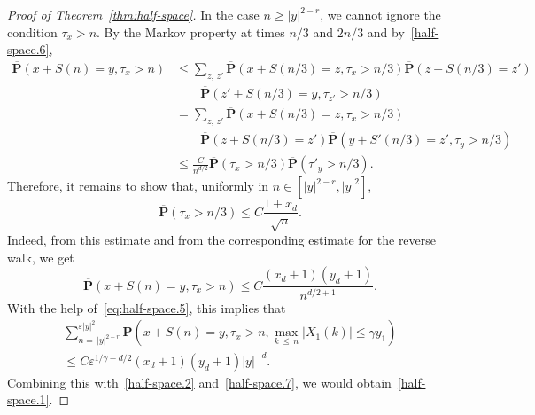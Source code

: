 \documentclass[10pt]{amsart}
\theoremstyle{definition}\newtheorem{defi}[theo]{Definition}\newtheorem{rema}[theo]{Remark}\newtheorem{exam}[theo]{Example}\newtheorem{exem}[theo]{Example}\newtheorem{nota}[theo]{Notation}
\newcommand{\pr}{\mathbf{P}}
\renewcommand{\le}{\leqslant}
\renewcommand{\ge}{\geqslant}
\begin{document}
\begin{proof}[Proof of Theorem~\ref{thm:half-space}]
In the case $n\ge| y|^{2-r}$, we cannot ignore the condition $\tau_x>n$. By the Markov property at times $n/3$ and $2n/3$ and by~\eqref{half-space.6},
\begin{align*}
\overline{\pr}\left(x+S(n)=y,\tau_x>n\right)
&\le\sum_{z,\,z'}\overline{\pr}\left(x+S(n/3)=z,\tau_x>n/3\right)\overline{\pr}\left(z+S(n/3)=z'\right)\\
&\qquad\overline{\pr}\left(z'+S(n/3)=y,\tau_{z'}>n/3\right)\\
&=\sum_{z,\,z'}\overline{\pr}\left(x+S(n/3)=z,\tau_x>n/3\right)\\
&\qquad\overline{\pr}\left(z+S(n/3)=z'\right)
\overline{\pr}\left(y+S'(n/3)=z',\tau_{y}>n/3\right)\\
&\le\frac{C}{n^{d/2}}
\overline{\pr}\left(\tau_x>n/3\right)\overline{\pr}\left(\tau'_y>n/3\right).
\end{align*}
Therefore, it remains to show that, uniformly in $n\in[|y|^{2-r},|y|^2]$,
\begin{equation}\label{half-space.8}
\overline{\pr}\left(\tau_x>n/3\right)\le C\frac{1+x_d}{\sqrt{n}}.
\end{equation}
Indeed, from this estimate and from the corresponding estimate for the reverse walk, we get
\[
\overline{\pr}\left(x+S(n)=y,\tau_x>n\right)\le C\frac{(x_d+1)(y_d+1)}{n^{d/2+1}}.
\]
With the help of~\eqref{eq:half-space.5}, this implies that
\begin{multline}\label{eq:new.est.4}
\sum_{n=\,|y|^{2-r}}^{\varepsilon|y|^2}
\pr\left(x+S(n)=y,\tau_x>n,\max_{k\,\le\,n}\left|X_1(k)\right|\le\gamma y_1\right)\\
\le C\varepsilon^{1/\gamma-d/2}(x_d+1)(y_d+1)|y|^{-d}.
\end{multline}
Combining this with~\eqref{half-space.2} and~\eqref{half-space.7}, we would obtain~\eqref{half-space.1}.


\end{proof}
\end{document}
